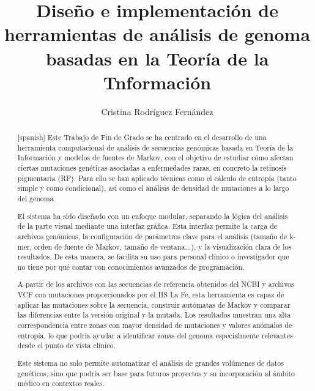 \documentclass[11pt,spanish,listoffigures,listoftables]{tfgetsinf}
\title{Diseño e implementación de herramientas de análisis de genoma basadas en la Teoría de la Tnformación}
\author{Cristina Rodríguez Fernández}
\begin{document}

\begin{abstract}[spanish]
   Este Trabajo de Fin de Grado se ha centrado en el desarrollo de una herramienta computacional de análisis de secuencias genómicas basada en Teoría de la Información y modelos de fuentes de Markov, con el objetivo de estudiar cómo afectan ciertas mutaciones genéticas asociadas a enfermedades raras, en concreto la retinosis pigmentaria (RP). Para ello se han aplicado técnicas como el cálculo de entropía (tanto simple y como condicional), así como el análisis de densidad de mutaciones a lo largo del genoma. 

   El sistema ha sido diseñado con un enfoque modular, separando la lógica del análisis de la parte visual mediante una interfaz gráfica. Esta interfaz permite la carga de archivos genómicos, la configuración de parámetros clave para el análisis (tamaño de k-mer, orden de fuente de Markov, tamaño de ventana...), y la visualización clara de los resultados. De esta manera, se facilita su uso para personal clínico o investigador que no tiene por qué contar con conocimientos avanzados de programación. 

   A partir de los archivos con las secuencias de referencia obtenidos del NCBI y archivos VCF con mutaciones proporcionados por el IIS La Fe, esta herramienta es capaz de aplicar las mutaciones sobre la secuencia, construir autómatas de Markov y comparar las diferencias entre la versión original y la mutada. Los resultados muestran una alta correspondencia entre zonas con mayor densidad de mutaciones y valores anómalos de entropía, lo que podría ayudar a identificar zonas del genoma especialmente relevantes desde el punto de vista clínico. 

   Este sistema no solo permite automatizar el análisis de grandes volúmenes de datos genéticos, sino que podría ser base para futuros proyectos y su incorporación al ámbito médico en contextos reales. 
   \\
   \\
\end{abstract}
\end{document}
